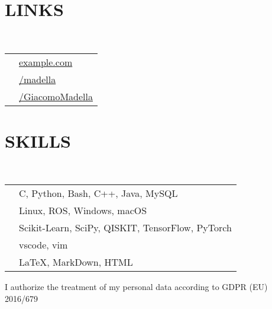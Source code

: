 {\begin{minipage}[t][\dimexpr\textheight-2\fboxrule-2\fboxsep\relax][t]{\dimexpr0.3\textwidth-2\fboxrule-2\fboxsep\relax}
        \section*{\large LINKS}
        \leftrule \\
        \leftfontsize
        \begin{tabular}{cl}
            \faCode{}     & \href{https://example.com}{example.com} \\
            \faGithub{}   & \href{https://gitlab.com/madella}{/madella} \\
            \faLinkedin{} & \href{https://www.linkedin.com/in/giacomomadella/}{/GiacomoMadella} 
        \end{tabular}
        \sectionspace
        \section*{\large SKILLS}
        \leftrule \\
        \leftfontsize
        \begin{tabularx}{\textwidth}{cY}
            \faCode{}        & C,  Python, Bash, C++, Java, MySQL \\
            \faCogs{}        & Linux, ROS, Windows, macOS \\
            \faToolbox{}     & Scikit-Learn, SciPy, QISKIT, TensorFlow, PyTorch \\
            \faLaptopCode{}  & vscode, vim \\
            \faPen*{}        & \LaTeX, MarkDown, HTML 
        \end{tabularx}
        \vfill
        {\tiny I authorize the treatment of my personal data according to GDPR (EU) 2016/679}
    \end{minipage}
}
